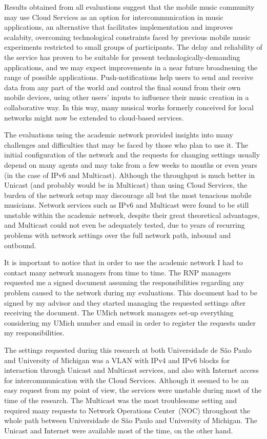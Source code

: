 Results obtained from all evaluations suggest that the mobile music community may use Cloud Services as an option for intercommunication in music applications, an alternative that facilitates implementation and improves scalabity, overcoming technological constraints faced by previous mobile music experiments restricted to small groups of participants.
The delay and reliability of the service has proven to be suitable for present technologically-demanding applications, and we may expect improvements in a near future broadnening the range of possible applications.
Push-notifications help users to send and receive data from any part of the world and control the final sound from their own mobile devices, using other users' inputs to influence their music creation in a collaborative way.
In this way, many musical works formerly conceived for local networks might now be extended to cloud-based services.

The evaluations using the academic network provided insights into many challenges and difficulties that may be faced by those who plan to use it.
The initial configuration of the network and the requests for changing settings usually depend on many agents and may take from a few weeks to months or even years (in the case of IPv6 and Multicast).
Although the throughput is much better in Unicast (and probably would be in Multicast) than using Cloud Services, the burden of the network setup may discourage all but the most tenacious mobile musicians.
Network services such as IPv6 and Multicast were found to be still unstable within the academic network, despite their great theoretical advantages, and Multicast could not even be adequately tested, due to years of recurring problems with network settings over the full network path, inbound and outbound.


It is important to notice that in order to use the academic network I had to contact many network managers from time to time.
The RNP managers requested me a signed document assuming the responsibilities regarding any problem caused to the network during my evaluations.
This document had to be signed by my advisor and they started managing the requested settings after receiving the document.
The UMich network managers set-up everything considering my UMich number and email in order to register the requests under my responsibilities.

The settings requested during this research at both Universidade de São Paulo and University of Michigan was a VLAN with IPv4 and IPv6 blocks for interaction through Unicast and Multicast services, and also with Internet access for intercommunication with the Cloud Services.
Although it seemed to be an easy request from my point of view, the services were unstable during most of the time of the research.
The Multicast was the most troublesome setting and required many requests to Network Operations Center~(NOC) throughout the whole path between Universidade de São Paulo and University of Michigan.
The Unicast and Internet were available most of the time, on the other hand.

